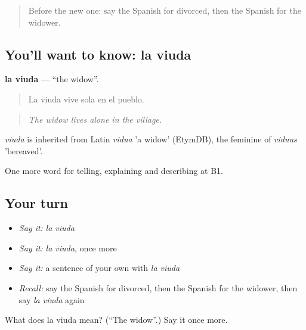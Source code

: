 \begin{quote}
Before the new one: say the Spanish for divorced, then the Spanish for the widower.
\end{quote}

\subsection*{You'll want to know: la viuda}
\textbf{la viuda} — \textquotedblleft{}the widow\textquotedblright{}.

\begin{quote}
La viuda vive sola en el pueblo.
\end{quote}

\begin{quote}
\emph{The widow lives alone in the village.}
\end{quote}

\begin{cousinweb}
\emph{viuda} is inherited from Latin \emph{vidua} 'a widow' (EtymDB), the feminine of \emph{viduus} 'bereaved'.
\end{cousinweb}

\begin{grammarlens}[title={What you've built}]
One more word for telling, explaining and describing at B1.
\end{grammarlens}

\subsection*{Your turn}
\begin{itemize}
\raggedright
  \item \emph{Say it:} \emph{la viuda}
  \item \emph{Say it:} \emph{la viuda}, once more
  \item \emph{Say it:} a sentence of your own with \emph{la viuda}
  \item \emph{Recall:} say the Spanish for divorced, then the Spanish for the widower, then say \emph{la viuda} again
\end{itemize}

\begin{tcolorbox}[breakable,colback=teal!4,colframe=teal!35!black,title={Before you move on}]
What does la viuda mean? (\textquotedblleft{}The widow\textquotedblright{}.) Say it once more.
\end{tcolorbox}
